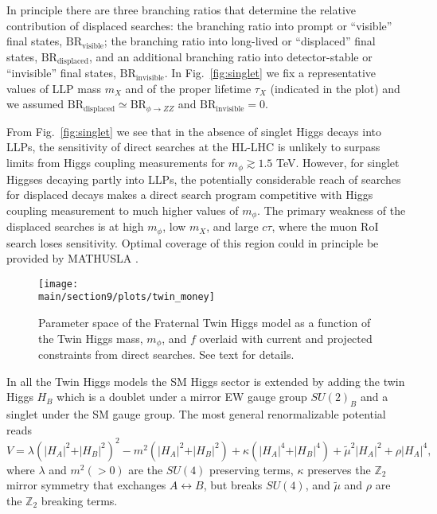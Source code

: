 In principle there are three branching ratios that determine the relative contribution of displaced searches: the branching ratio into prompt or ``visible'' final states, $\text{BR}_{\text{visible}}$; the branching ratio into long-lived or ``displaced'' final states, $\text{BR}_{\text{displaced}}$, and an additional branching ratio into detector-stable or ``invisible'' final states, $\text{BR}_{\text{invisible}}$. In Fig.~\ref{fig:singlet} we fix a representative values of LLP mass $m_X$ and of the proper lifetime $\tau_X$ (indicated in the plot) and we assumed $ \text{BR}_{\text{displaced}} \simeq \text{BR}_{\phi \rightarrow ZZ}$ and $\text{BR}_{\text{invisible}} = 0$. 

From Fig.~\ref{fig:singlet} we see that in the absence of singlet Higgs decays into LLPs, the sensitivity of direct searches at the HL-LHC is unlikely to surpass limits from Higgs coupling measurements for $m_\phi \gtrsim 1.5$ TeV. However, for singlet Higgses decaying partly into LLPs, the potentially considerable reach of searches for displaced decays makes a direct search program competitive with Higgs coupling measurement to much higher values of $m_\phi$. The primary weakness of the displaced searches is at high $m_\phi$, low $m_X$, and large $c \tau$, where the muon RoI search loses sensitivity. Optimal coverage of this region could in principle be provided by MATHUSLA \cite{Curtin:2018mvb}.


\begin{figure}[h!]
\centering
\texttt{[image: \\main/section9/plots/twin\_money]}
\caption{Parameter space of the Fraternal Twin Higgs model as a function of the Twin Higgs mass, $m_\phi$, and $f$ overlaid with current and projected constraints from direct searches. See text for details.
\label{fig:twinmoney}
}
\end{figure}


In all the Twin Higgs models the SM Higgs sector is extended by adding the twin Higgs $H_B$ which is a doublet under a mirror EW gauge group $SU(2)_B$ and a singlet under the SM gauge group. The most general renormalizable potential reads 
\begin{equation}
V=\lambda\left(\vert H_A\vert^2+\vert H_B\vert^2\right)^2-m^2\left(\vert H_A\vert^2+\vert H_B\vert^2\right)+\kappa\left(\vert H_A\vert^4+\vert H_B\vert^4\right)+\tilde{\mu}^2\vert H_A\vert^2+\rho \vert H_A\vert^4,\label{eq:V_TH}
\end{equation}
where $\lambda$ and $m^2 (>0)$ are the $SU(4)$ preserving terms, $\kappa$ preserves the $\mathbb{Z}_2$ mirror symmetry that exchanges $A\leftrightarrow B$, but breaks $SU(4)$, and $\tilde\mu$ and $\rho$ are the $\mathbb{Z}_2$ breaking terms.

